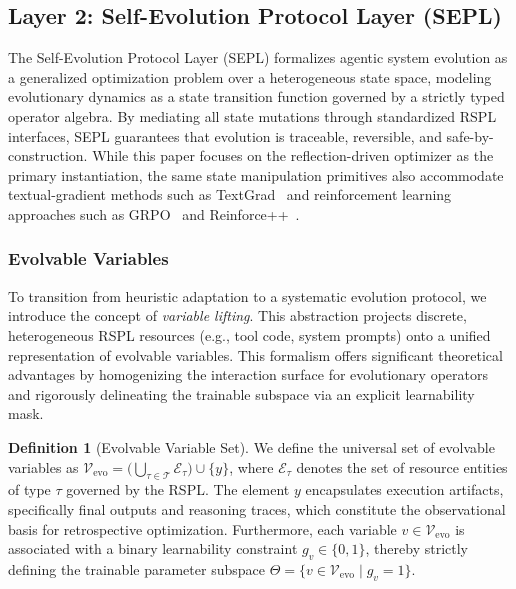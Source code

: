 \documentclass{article}
\newcommand{\Tau}{\mathcal{T}}
\theoremstyle{plain}
\theoremstyle{definition}
\newtheorem{definition}[theorem]{Definition}
\theoremstyle{remark}
\begin{document}
\vspace{-0.2cm}
\subsection{Layer 2: Self-Evolution Protocol Layer (SEPL)}
\vspace{-0.2cm}

The Self-Evolution Protocol Layer (SEPL) formalizes agentic system evolution as a generalized optimization problem over a heterogeneous state space, modeling evolutionary dynamics as a state transition function governed by a strictly typed operator algebra. By mediating all state mutations through standardized RSPL interfaces, SEPL guarantees that evolution is traceable, reversible, and safe-by-construction. While this paper focuses on the reflection-driven optimizer as the primary instantiation, the same state manipulation primitives also accommodate textual-gradient methods such as TextGrad~\citep{yuksekgonul2025optimizing} and reinforcement learning approaches such as GRPO~\citep{shao2024deepseekmath} and Reinforce++~\citep{hu2025reinforce++}.

\vspace{-0.2cm}
\subsubsection{Evolvable Variables}
\vspace{-0.2cm}

To transition from heuristic adaptation to a systematic evolution protocol, we introduce the concept of \emph{variable lifting}. This abstraction projects discrete, heterogeneous RSPL resources (e.g., tool code, system prompts) onto a unified representation of evolvable variables. This formalism offers significant theoretical advantages by homogenizing the interaction surface for evolutionary operators and rigorously delineating the trainable subspace via an explicit learnability mask.

\begin{definition}[Evolvable Variable Set]
  We define the universal set of evolvable variables as $\mathcal{V}_{\text{evo}} = \bigl(\bigcup_{\tau \in \Tau} \mathcal{E}_{\tau}\bigr) \cup \{y\}$, where $\mathcal{E}_{\tau}$ denotes the set of resource entities of type $\tau$ governed by the RSPL. The element $y$ encapsulates execution artifacts, specifically final outputs and reasoning traces, which constitute the observational basis for retrospective optimization. Furthermore, each variable $v \in \mathcal{V}_{\text{evo}}$ is associated with a binary learnability constraint $g_{v} \in \{0,1\}$, thereby strictly defining the trainable parameter subspace $\Theta = \{v \in \mathcal{V}_{\text{evo}} \mid g_{v}=1\}$.
\end{definition}
\end{document}
